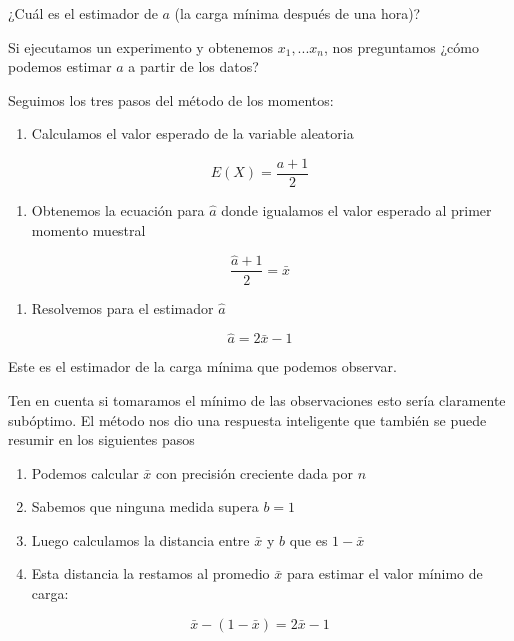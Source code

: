 \documentclass[
]{book}
\providecommand{\tightlist}{%
  \setlength{\itemsep}{0pt}\setlength{\parskip}{0pt}}
\begin{document}
¿Cuál es el estimador de \(a\) (la carga mínima después de una hora)?

Si ejecutamos un experimento y obtenemos \(x_1,...x_n\), nos preguntamos ¿cómo podemos estimar \(a\) a partir de los datos?

Seguimos los tres pasos del método de los momentos:

\begin{enumerate}
\def\labelenumi{\arabic{enumi}.}
\tightlist
\item
  Calculamos el valor esperado de la variable aleatoria
\end{enumerate}

\[E(X)=\frac{a+1}{2}\]

\begin{enumerate}
\def\labelenumi{\arabic{enumi}.}
\setcounter{enumi}{1}
\tightlist
\item
  Obtenemos la ecuación para \(\hat{a}\) donde igualamos el valor esperado al primer momento muestral
\end{enumerate}

\[\frac{\hat{a}+1}{2}=\bar{x}\]

\begin{enumerate}
\def\labelenumi{\arabic{enumi}.}
\setcounter{enumi}{2}
\tightlist
\item
  Resolvemos para el estimador \(\hat{a}\)
\end{enumerate}

\[\hat{a}=2\bar{x}-1\]

Este es el estimador de la carga mínima que podemos observar.

Ten en cuenta si tomaramos el mínimo de las observaciones esto sería claramente subóptimo. El método nos dio una respuesta inteligente que también se puede resumir en los siguientes pasos

\begin{enumerate}
\def\labelenumi{\alph{enumi})}
\tightlist
\item
  Podemos calcular \(\bar{x}\) con precisión creciente dada por \(n\)
\item
  Sabemos que ninguna medida supera \(b=1\)
\item
  Luego calculamos la distancia entre \(\bar{x}\) y \(b\) que es \(1-\bar{x}\)
\item
  Esta distancia la restamos al promedio \(\bar{x}\) para estimar el valor mínimo de carga:
\end{enumerate}

\[\bar{x}-(1-\bar{x})=2\bar{x}-1\]
\end{document}
